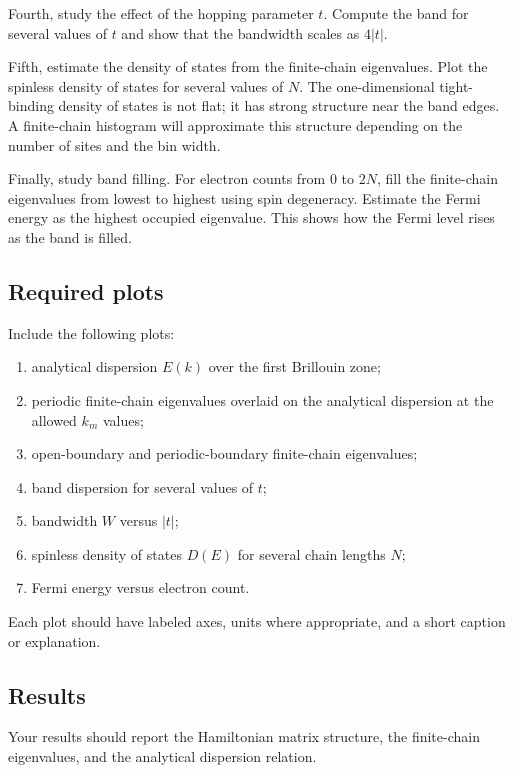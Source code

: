 Fourth, study the effect of the hopping parameter \(t\). Compute the band for several values of \(t\) and show that the bandwidth scales as \(4|t|\).

Fifth, estimate the density of states from the finite-chain eigenvalues. Plot the spinless density of states for several values of \(N\). The one-dimensional tight-binding density of states is not flat; it has strong structure near the band edges. A finite-chain histogram will approximate this structure depending on the number of sites and the bin width.

Finally, study band filling. For electron counts from \(0\) to \(2N\), fill the finite-chain eigenvalues from lowest to highest using spin degeneracy. Estimate the Fermi energy as the highest occupied eigenvalue. This shows how the Fermi level rises as the band is filled.

\subsection{Required plots}

Include the following plots:

\begin{enumerate}
    \item analytical dispersion \(E(k)\) over the first Brillouin zone;
    \item periodic finite-chain eigenvalues overlaid on the analytical dispersion at the allowed \(k_m\) values;
    \item open-boundary and periodic-boundary finite-chain eigenvalues;
    \item band dispersion for several values of \(t\);
    \item bandwidth \(W\) versus \(|t|\);
    \item spinless density of states \(D(E)\) for several chain lengths \(N\);
    \item Fermi energy versus electron count.
\end{enumerate}

Each plot should have labeled axes, units where appropriate, and a short caption or explanation.

\subsection{Results}

Your results should report the Hamiltonian matrix structure, the finite-chain eigenvalues, and the analytical dispersion relation.

